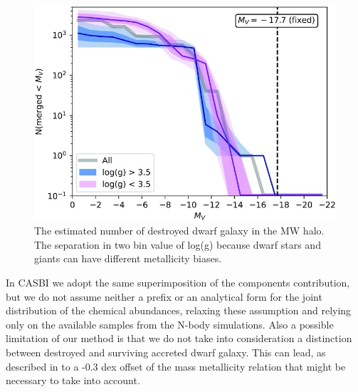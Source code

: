 \begin{figure}[h]
    \centering
    \includegraphics[width=1\textwidth]{./figure/unraveling_mass_spectrum.jpeg}
    \caption{The estimated number of destroyed dwarf galaxy in the MW halo. The separation in two bin value of log(g) because dwarf stars and giants can have different metallicity biases. }
    \label{fig:unraveling_mass_spectrum}
\end{figure}

In CASBI we adopt the same superimposition of the components contribution, but we do not assume neither a prefix or an analytical form for the joint distribution of the chemical abundances, relaxing these assumption and relying only on the available samples from the N-body simulations. Also a possible limitation of our method is that we do not take into consideration a distinction between destroyed and surviving accreted dwarf galaxy. This can lead, as described in \cite{naiduEvidenceH3Survey2020} to a -0.3 dex offset of the mass metallicity \cite{kirbyMULTIELEMENTABUNDANCEMEASUREMENTS2011} relation that might be necessary to take into account. 